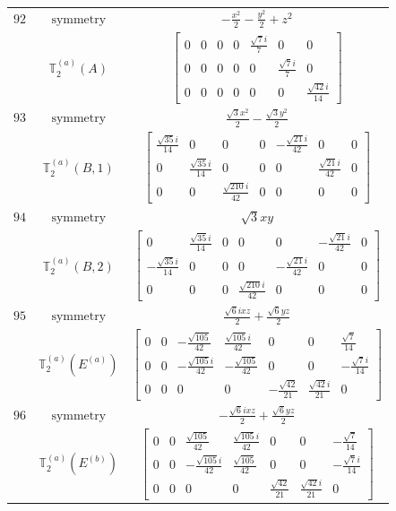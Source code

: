 \documentclass[fleqn,8pt,landscape]{jsarticle}
\begin{document}
\begin{longtable}{ccc}
$ 92 $ & $ \text{symmetry} $ & $ - \frac{x^{2}}{2} - \frac{y^{2}}{2} + z^{2} $ \\
$  $ & $ \mathbb{T}_{2}^{(a)}(A) $ & $ \begin{bmatrix} 0 & 0 & 0 & 0 & \frac{\sqrt{7} i}{7} & 0 & 0 \\ 0 & 0 & 0 & 0 & 0 & \frac{\sqrt{7} i}{7} & 0 \\ 0 & 0 & 0 & 0 & 0 & 0 & \frac{\sqrt{42} i}{14} \end{bmatrix} $ \\ \hline
$ 93 $ & $ \text{symmetry} $ & $ \frac{\sqrt{3} x^{2}}{2} - \frac{\sqrt{3} y^{2}}{2} $ \\
$  $ & $ \mathbb{T}_{2}^{(a)}(B,1) $ & $ \begin{bmatrix} \frac{\sqrt{35} i}{14} & 0 & 0 & 0 & - \frac{\sqrt{21} i}{42} & 0 & 0 \\ 0 & \frac{\sqrt{35} i}{14} & 0 & 0 & 0 & \frac{\sqrt{21} i}{42} & 0 \\ 0 & 0 & \frac{\sqrt{210} i}{42} & 0 & 0 & 0 & 0 \end{bmatrix} $ \\ \hline
$ 94 $ & $ \text{symmetry} $ & $ \sqrt{3} x y $ \\
$  $ & $ \mathbb{T}_{2}^{(a)}(B,2) $ & $ \begin{bmatrix} 0 & \frac{\sqrt{35} i}{14} & 0 & 0 & 0 & - \frac{\sqrt{21} i}{42} & 0 \\ - \frac{\sqrt{35} i}{14} & 0 & 0 & 0 & - \frac{\sqrt{21} i}{42} & 0 & 0 \\ 0 & 0 & 0 & \frac{\sqrt{210} i}{42} & 0 & 0 & 0 \end{bmatrix} $ \\ \hline
$ 95 $ & $ \text{symmetry} $ & $ \frac{\sqrt{6} i x z}{2} + \frac{\sqrt{6} y z}{2} $ \\
$  $ & $ \mathbb{T}_{2}^{(a)}(E^{(a)}) $ & $ \begin{bmatrix} 0 & 0 & - \frac{\sqrt{105}}{42} & \frac{\sqrt{105} i}{42} & 0 & 0 & \frac{\sqrt{7}}{14} \\ 0 & 0 & - \frac{\sqrt{105} i}{42} & - \frac{\sqrt{105}}{42} & 0 & 0 & - \frac{\sqrt{7} i}{14} \\ 0 & 0 & 0 & 0 & - \frac{\sqrt{42}}{21} & \frac{\sqrt{42} i}{21} & 0 \end{bmatrix} $ \\ \hline
$ 96 $ & $ \text{symmetry} $ & $ - \frac{\sqrt{6} i x z}{2} + \frac{\sqrt{6} y z}{2} $ \\
$  $ & $ \mathbb{T}_{2}^{(a)}(E^{(b)}) $ & $ \begin{bmatrix} 0 & 0 & \frac{\sqrt{105}}{42} & \frac{\sqrt{105} i}{42} & 0 & 0 & - \frac{\sqrt{7}}{14} \\ 0 & 0 & - \frac{\sqrt{105} i}{42} & \frac{\sqrt{105}}{42} & 0 & 0 & - \frac{\sqrt{7} i}{14} \\ 0 & 0 & 0 & 0 & \frac{\sqrt{42}}{21} & \frac{\sqrt{42} i}{21} & 0 \end{bmatrix} $ \\ \hline

\end{longtable}
\end{document}
